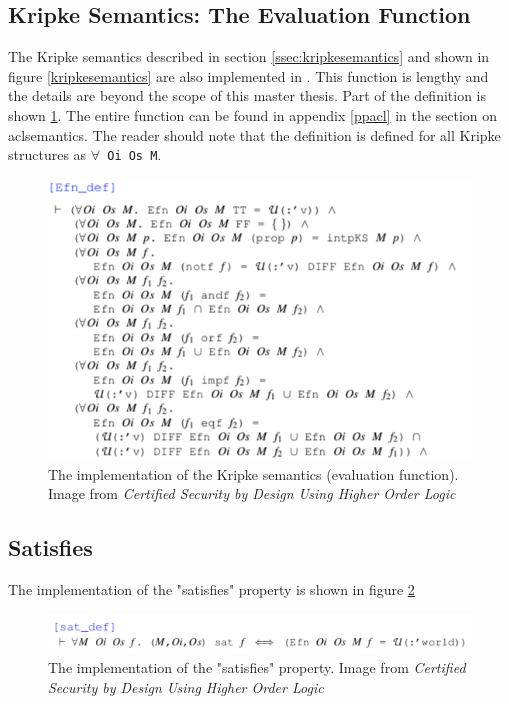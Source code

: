 \documentclass[../../main/main.tex]{subfiles}
\begin{document}
\subsection{Kripke Semantics: The Evaluation Function}
The Kripke semantics described in section \ref{ssec:kripkesemantics} and shown in figure \ref{kripkesemantics} are also implemented in .  This function is lengthy and the details are beyond the scope of this master thesis.  Part of the definition is shown \ref{Efn}.  The entire function can be found in appendix \ref{ppacl} in the section on aclsemantics.  The reader should note that the definition is defined for all Kripke structures as \texttt{$\forall$ Oi Os M}.


\begin{figure}[h]
\centering
\includegraphics[width=\textwidth]{../figures/Efn}
\caption{\label{Efn}The  implementation of the Kripke semantics (evaluation function).  Image from  \textit{Certified Security by Design Using Higher Order Logic}\cite{certmanual}}
\end{figure}


\subsection{Satisfies}
The implementation of the "satisfies" property is shown in figure \ref{satdef}

\begin{figure}[h]
\centering
\includegraphics[width=\textwidth]{../figures/satdef}
\caption{\label{satdef}The  implementation of the "satisfies" property.  Image from  \textit{Certified Security by Design Using Higher Order Logic}\cite{certmanual}}
\end{figure}
\end{document}

